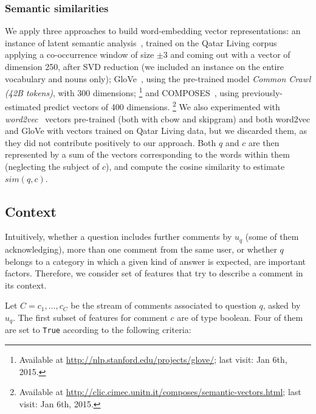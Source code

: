 \subsubsection{Semantic similarities}
\label{sub:semantic}

We apply three approaches to build  word-embedding vector representations:
\Ni an instance of latent semantic analysis~\cite{croce-previtali:2010:GEMS}, 
trained on the Qatar Living corpus applying a co-occurrence window of size 
$\pm3$ and coming out with a vector of dimension 250, after SVD reduction (we 
included an instance on the entire vocabulary and nouns only);
\Nii GloVe~\cite{Pennington:2014}, using the pre-trained model \textit{Common 
Crawl (42B tokens)}, with 300 dimensions;%
\footnote{Available at \url{http://nlp.stanford.edu/projects/glove/}; last 
visit: Jan 6th, 2015.}
and \Niii COMPOSES~\cite{Baroni:2014}, using previously-estimated predict 
vectors of 400 dimensions.%
\footnote{Available at 
\url{http://clic.cimec.unitn.it/composes/semantic-vectors.html}; last visit: Jan 
6th, 2015.}
We also experimented with \textit{word2vec}~\cite{Mikolov:2013} 
vectors pre-trained (both with cbow and skipgram) and both word2vec and GloVe 
with vectors trained on Qatar Living data, but we discarded them, as they did 
not contribute positively to our approach.
Both $q$ and $c$ are then represented by a sum of the vectors 
corresponding to the words within them (neglecting the subject of $c$), and 
compute the cosine similarity to estimate $sim(q,c)$. 


\subsection{Context }
\label{ssub:context}

Intuitively, whether a question includes further comments by $u_q$ (some of 
them acknowledging), more than one comment from the same user, or whether $q$ 
belongs to a category in which a given kind of answer is expected, are important 
factors. Therefore, we consider set of features that 
try to describe a comment in its context.   

Let $C={c_1, \ldots,c_C}$ be the stream of comments associated to question $q$, 
asked by $u_q$. The first subset of features for comment $c$ are of type 
boolean. Four of them are set to \texttt{True} according to the 
following criteria:


